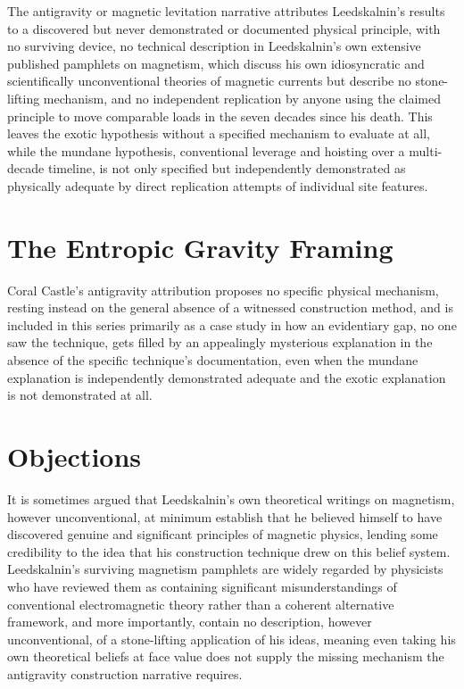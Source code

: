 \documentclass[11pt]{article}
\begin{document}
The antigravity or magnetic levitation narrative attributes Leedskalnin's results to a discovered but never demonstrated or documented physical principle, with no surviving device, no technical description in Leedskalnin's own extensive published pamphlets on magnetism, which discuss his own idiosyncratic and scientifically unconventional theories of magnetic currents but describe no stone-lifting mechanism, and no independent replication by anyone using the claimed principle to move comparable loads in the seven decades since his death. This leaves the exotic hypothesis without a specified mechanism to evaluate at all, while the mundane hypothesis, conventional leverage and hoisting over a multi-decade timeline, is not only specified but independently demonstrated as physically adequate by direct replication attempts of individual site features.

\section{The Entropic Gravity Framing}

Coral Castle's antigravity attribution proposes no specific physical mechanism, resting instead on the general absence of a witnessed construction method, and is included in this series primarily as a case study in how an evidentiary gap, no one saw the technique, gets filled by an appealingly mysterious explanation in the absence of the specific technique's documentation, even when the mundane explanation is independently demonstrated adequate and the exotic explanation is not demonstrated at all.

\section{Objections}

It is sometimes argued that Leedskalnin's own theoretical writings on magnetism, however unconventional, at minimum establish that he believed himself to have discovered genuine and significant principles of magnetic physics, lending some credibility to the idea that his construction technique drew on this belief system. Leedskalnin's surviving magnetism pamphlets are widely regarded by physicists who have reviewed them as containing significant misunderstandings of conventional electromagnetic theory rather than a coherent alternative framework, and more importantly, contain no description, however unconventional, of a stone-lifting application of his ideas, meaning even taking his own theoretical beliefs at face value does not supply the missing mechanism the antigravity construction narrative requires.
\end{document}
